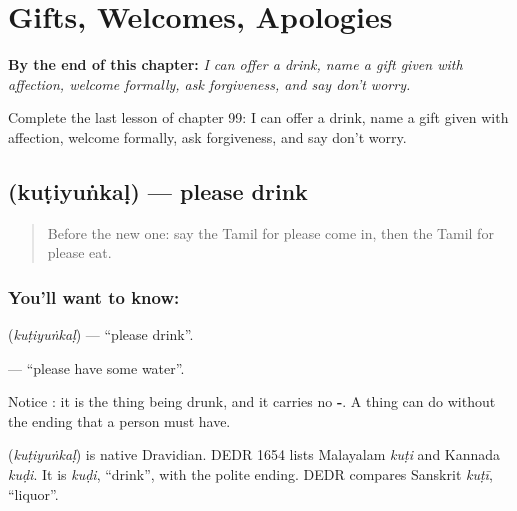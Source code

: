 
\chapter{Gifts, Welcomes, Apologies}
\label{ch:ta-gifts-welcomes}

\begin{chapteropening}
\textbf{By the end of this chapter:} \emph{I can offer a drink, name a gift given with affection, welcome formally, ask forgiveness, and say don't worry.}

Complete the last lesson of chapter 99: I can offer a drink, name a gift given with affection, welcome formally, ask forgiveness, and say don't worry.
\end{chapteropening}

\section[\texorpdfstring{\ta{குடியுங்கள்} (kuṭiyuṅkaḷ)}{குடியுங்கள் (kuṭiyuṅkaḷ)}]{ (kuṭiyuṅkaḷ) — please drink}

\label{lesson:TA-C99-drink}



\begin{quote}
Before the new one: say the Tamil for please come in, then the Tamil for please eat.
\end{quote}

\subsection*{You'll want to know: }
\textbf{} (\emph{kuṭiyuṅkaḷ}) — \textquotedblleft{}please drink\textquotedblright{}.

\textbf{ } — \textquotedblleft{}please have some water\textquotedblright{}.

Notice \textbf{}: it is the thing being drunk, and it carries no \textbf{-}. A thing can do without the ending that a person must have.

\begin{cousinweb}
\textbf{} (\emph{kuṭiyuṅkaḷ}) is native Dravidian. DEDR 1654 lists Malayalam \emph{kuṭi} and Kannada \emph{kuḍi}. It is \emph{kuḍi}, \textquotedblleft{}drink\textquotedblright{}, with the polite ending. DEDR compares Sanskrit \emph{kuṭī}, \textquotedblleft{}liquor\textquotedblright{}.
\end{cousinweb}

